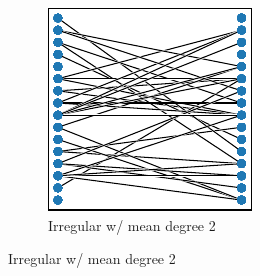 \begin{figure}[!htbp]
\begin{center}
\begin{minipage}{0.95\textwidth}
\begin{minipage}{0.95\linewidth}
\begin{subfigure}[b]{0.5\textwidth}
\includegraphics[width=\textwidth]{img/graph_layouts/title=irregular-2+ext=}%
\caption{
Irregular w/ mean degree 2
}
\label{fig:irregular_2}
\label{fig:irregular_degree_2}
\end{subfigure}

\end{minipage}

\vspace{2ex}

\begin{minipage}{\textwidth}


\end{minipage}
\end{minipage}
\end{center}
\end{figure}
